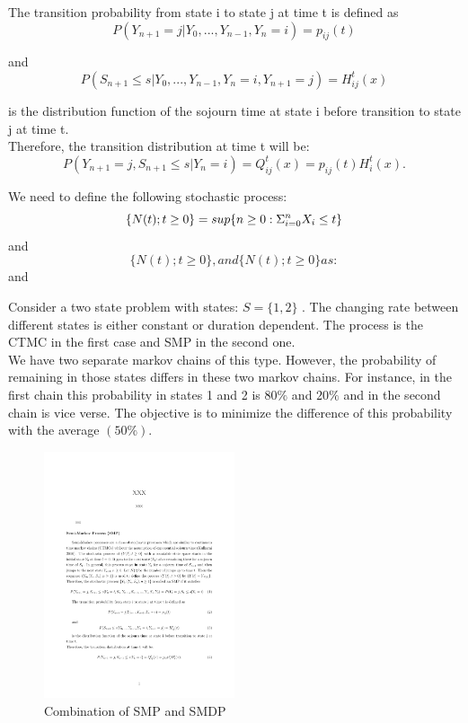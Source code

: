 \documentclass[12pt,letterpaper]{article}
\begin{document}
The transition probability from state i to state j at time t is defined as
\begin{equation}
P(Y_{n+1}=j|Y_0, ..., Y_{n-1},Y_{n}=i)=p_{ij}(t)
\end{equation}

and
\begin{equation}
P(S_{n+1}\le s|Y_0, ..., Y_{n-1},Y_{n}=i,Y_{n+1}=j)=H_{ij}^t(x)
\end{equation}

is the distribution function of the sojourn time at state i before transition
to state j at time t.\\
Therefore, the transition distribution at time t will be:
\begin{equation}
P(Y_{n+1}=j, S_{n+1}\le s |Y_n=i)=Q_{ij}^t(x)=p_{ij}(t)H_i^t(x).
\end{equation}

We need to define the following stochastic process:
\begin{equation}

\{N(t); t\geq 0\}= sup\{n\geq 0 : \Sigma_{i=0}^n X_i \leq t\}\\




\end{equation}
and
\begin{equation}
\{N(t); t\geq 0\}
, and \{N(t); t\geq 0\} as:
\end{equation} and 

Consider a two state problem with states: $S=\{1,2\}$ . The changing rate between different states is either constant or duration dependent. The process is the CTMC in the first case and SMP in the second one.\\
We have two separate markov chains of this type. However, the probability of remaining in those states differs in these two markov chains. For instance, in the first chain this probability in states 1 and 2 is $80\%$ and $20\%$ and in the second chain is vice verse. The objective is to minimize the difference of this probability with the average $(50\%)$. 

\begin{figure}[h!]
  \centering
    
      \includegraphics[width=0.5\textwidth]{SMP}
  \caption{Combination of SMP and SMDP}
\end{figure}
\end{document}
